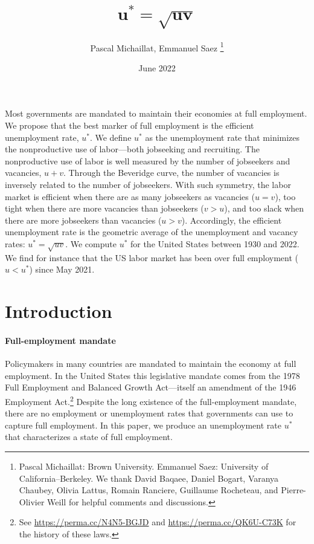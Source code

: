 \documentclass[letterpaper,12pt,leqno]{article}
\begin{document}
\title{$\bm{u^*=\sqrt{uv}}$}
\author{Pascal Michaillat, Emmanuel Saez
\thanks{Pascal Michaillat: Brown University. Emmanuel Saez: University of California--Berkeley. We thank David Baqaee, Daniel Bogart, Varanya Chaubey, Olivia Lattus, Romain Ranciere, Guillaume Rocheteau, and Pierre-Olivier Weill for helpful comments and discussions.}}
\date{June 2022}                       

\begin{titlepage}\maketitle

Most governments are mandated to maintain their economies at full employment. We propose that the best marker of full employment is the efficient unemployment rate, $u^*$. We define $u^*$ as the unemployment rate that minimizes the nonproductive use of labor---both jobseeking and recruiting. The nonproductive use of labor is well measured by the number of jobseekers and vacancies, $u + v$. Through the Beveridge curve, the number of vacancies is inversely related to the number of jobseekers. With such symmetry, the labor market is efficient when there are as many jobseekers as vacancies ($u = v$), too tight when there are more vacancies than jobseekers ($v > u$), and too slack when there are more jobseekers than vacancies ($u > v$). Accordingly, the efficient unemployment rate is the geometric average of the unemployment and vacancy rates: $u^* = \sqrt{uv}$. We compute $u^*$ for the United States between 1930 and 2022. We find for instance that the US labor market has been over full employment ($u < u^*$) since May 2021.

\end{titlepage}\section{Introduction}
 
\paragraph{Full-employment mandate} Policymakers in many countries are mandated to maintain the economy at full employment. In the United States this legislative mandate comes from the 1978 Full Employment and Balanced Growth Act---itself an amendment of the 1946 Employment Act.\footnote{See \url{https://perma.cc/N4N5-BGJD} and \url{https://perma.cc/QK6U-C73K} for the history of these laws.} Despite the long existence of the full-employment mandate, there are no employment or unemployment rates that governments can use to capture full employment. In this paper, we produce an unemployment rate $u^*$ that characterizes a state of full employment.
\end{document}
